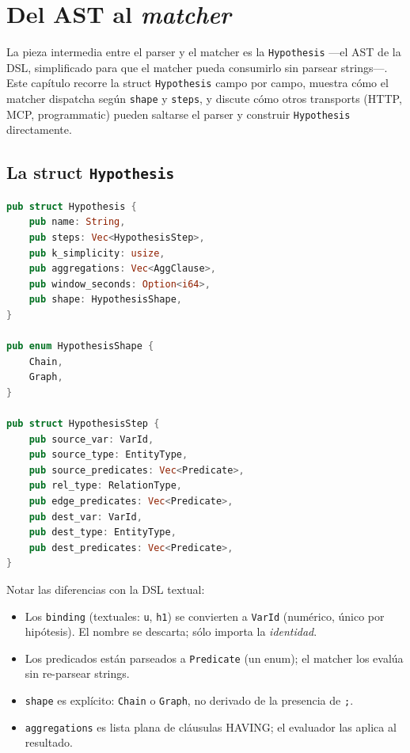 \chapter{Del AST al \emph{matcher}}
\label{cap:ast}

\begin{intuicion}
La pieza intermedia entre el parser y el matcher es la
\texttt{Hypothesis} ---el AST de la DSL, simplificado para que el
matcher pueda consumirlo sin parsear strings---. Este capítulo
recorre la struct \texttt{Hypothesis} campo por campo, muestra cómo
el matcher dispatcha según \texttt{shape} y \texttt{steps}, y
discute cómo otros transports (HTTP, MCP, programmatic) pueden
saltarse el parser y construir \texttt{Hypothesis} directamente.
\end{intuicion}

\section{La struct \texttt{Hypothesis}}

\begin{lstlisting}[language=Rust]
pub struct Hypothesis {
    pub name: String,
    pub steps: Vec<HypothesisStep>,
    pub k_simplicity: usize,
    pub aggregations: Vec<AggClause>,
    pub window_seconds: Option<i64>,
    pub shape: HypothesisShape,
}

pub enum HypothesisShape {
    Chain,
    Graph,
}

pub struct HypothesisStep {
    pub source_var: VarId,
    pub source_type: EntityType,
    pub source_predicates: Vec<Predicate>,
    pub rel_type: RelationType,
    pub edge_predicates: Vec<Predicate>,
    pub dest_var: VarId,
    pub dest_type: EntityType,
    pub dest_predicates: Vec<Predicate>,
}
\end{lstlisting}

\noindent
Notar las diferencias con la DSL textual:

\begin{itemize}
    \item Los \texttt{binding} (textuales: \texttt{u}, \texttt{h1})
    se convierten a \texttt{VarId} (numérico, único por
    hipótesis). El nombre se descarta; sólo importa la
    \emph{identidad}.
    \item Los predicados están parseados a \texttt{Predicate} (un
    enum); el matcher los evalúa sin re-parsear strings.
    \item \texttt{shape} es explícito: \texttt{Chain} o
    \texttt{Graph}, no derivado de la presencia de \texttt{;}.
    \item \texttt{aggregations} es lista plana de cláusulas
    HAVING; el evaluador las aplica al resultado.
\end{itemize}

